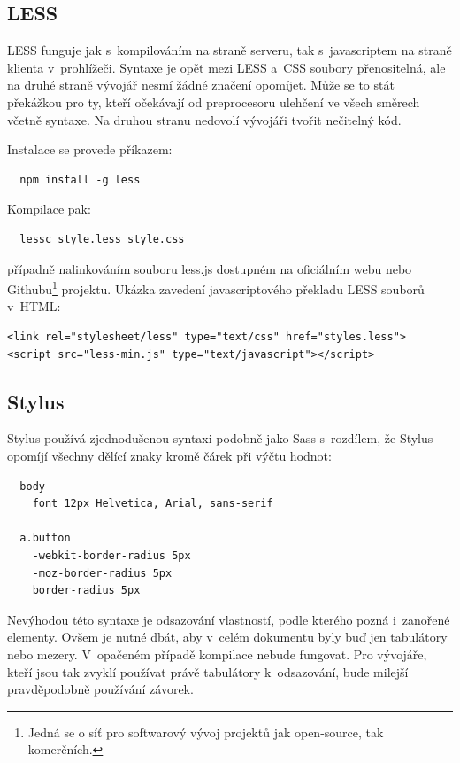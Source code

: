 \documentclass[thesis=B,czech]{FITthesis}[2012/06/26]
\begin{document}
\subsection{LESS}

LESS funguje jak s~kompilováním na straně serveru, tak s~javascriptem na straně klienta v~prohlížeči. Syntaxe je opět mezi LESS a~\gls{CSS} soubory přenositelná, ale na druhé straně vývojář nesmí žádné značení opomíjet. Může se to stát překážkou pro ty, kteří očekávají od preprocesoru ulehčení ve všech směrech včetně syntaxe. Na druhou stranu nedovolí vývojáři tvořit nečitelný kód.

\noindent Instalace se provede příkazem:
\scriptsize
\begin{verbatim}
  npm install -g less
\end{verbatim}
\normalsize
Kompilace pak:
\scriptsize
\begin{verbatim}
  lessc style.less style.css 
\end{verbatim}
\normalsize
případně nalinkováním souboru less.js dostupném na  oficiálním webu nebo Githubu\footnote{Jedná se o síť pro softwarový vývoj projektů jak open-source, tak komerčních.} projektu. Ukázka zavedení javascriptového překladu LESS souborů v~\gls{HTML}:
\scriptsize
\begin{verbatim}
<link rel="stylesheet/less" type="text/css" href="styles.less">
<script src="less-min.js" type="text/javascript"></script>
\end{verbatim}
\normalsize

\subsection{Stylus}

Stylus používá zjednodušenou syntaxi podobně jako \gls{Sass} s~rozdílem, že Stylus opomíjí všechny dělící znaky kromě čárek při výčtu hodnot:
\scriptsize
\begin{verbatim}
  body
    font 12px Helvetica, Arial, sans-serif

  a.button
    -webkit-border-radius 5px
    -moz-border-radius 5px
    border-radius 5px
\end{verbatim}
\normalsize
Nevýhodou této syntaxe je odsazování vlastností, podle kterého pozná i~zanořené elementy. Ovšem  je nutné dbát, aby v~celém dokumentu byly buď jen tabulátory nebo mezery. V~opačeném případě kompilace nebude fungovat. Pro vývojáře, kteří jsou tak zvyklí používat právě tabulátory k~odsazování, bude milejší pravděpodobně používání závorek. 
\end{document}
